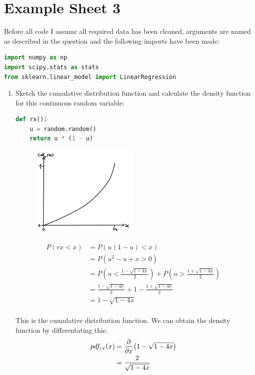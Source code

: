 \documentclass[10pt,\jkfside,a4paper]{article}
\begin{document}
\section{Example Sheet 3}

Before all code I assume all required data has been cleaned, arguments are
named as described in the question and the following imports have been made:
\begin{lstlisting}[language=Python]
import numpy as np
import scipy.stats as stats
from sklearn.linear_model import LinearRegression
\end{lstlisting}

\begin{enumerate}

\item Sketch the cumulative distribution function and calculate the density
function for this continuous random variable:

\begin{lstlisting}[language=Python]
def rx():
	u = random.random()
	return u * (1 - u)
\end{lstlisting}

\begin{figure}[H]
\centering
\includegraphics[width=0.5\textwidth]{./cdf_x}
\end{figure}

\[
\begin{split}
P(rx < x)
&= P(u(1 - u) < x) \\
&= P(u^2 - u + x > 0) \\
&= P\left( u < \frac{1 - \sqrt{1 - 4x}}{2} \right) + P\left( u > \frac{1 +
\sqrt{1 - 4x}}{2} \right) \\
&= \frac{1 - \sqrt{1 - 4x}}{2} + 1 - \frac{1 + \sqrt{1 - 4x}}{2} \\
&= 1 - \sqrt{1 - 4x} \\
\end{split}
\]

This is the cumulative distribution function. We can obtain the density
function by differentating this:
\[
\begin{split}
pdf_{rx}(x)
&= \pdv{x}(1 - \sqrt{1 - 4x}) \\
&= \frac{2}{\sqrt{1 - 4x}} \\
\end{split}
\]


\end{enumerate}
\end{document}
